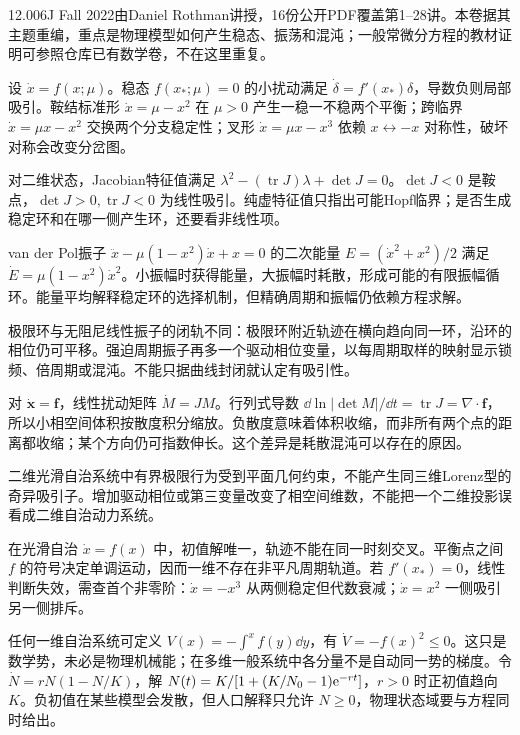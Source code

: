 12.006J Fall 2022由Daniel Rothman讲授，16份公开PDF覆盖第1--28讲。本卷据其主题重编，重点是物理模型如何产生稳态、振荡和混沌；一般常微分方程的教材证明可参照仓库已有数学卷，不在这里重复。

设 $\dot x=f(x;\mu)$。稳态 $f(x_*;\mu)=0$ 的小扰动满足 $\dot\delta=f'(x_*)\delta$，导数负则局部吸引。鞍结标准形 $\dot x=\mu-x^2$ 在 $\mu>0$ 产生一稳一不稳两个平衡；跨临界 $\dot x=\mu x-x^2$ 交换两个分支稳定性；叉形 $\dot x=\mu x-x^3$ 依赖 $x\leftrightarrow-x$ 对称性，破坏对称会改变分岔图。

对二维状态，Jacobian特征值满足 $\lambda^2-(\operatorname{tr}J)\lambda+\det J=0$。$\det J<0$ 是鞍点，$\det J>0,\operatorname{tr}J<0$ 为线性吸引。纯虚特征值只指出可能Hopf临界；是否生成稳定环和在哪一侧产生环，还要看非线性项。

van der Pol振子 $\ddot x-\mu(1-x^2)\dot x+x=0$ 的二次能量 $E=(\dot x^2+x^2)/2$ 满足 $\dot E=\mu(1-x^2)\dot x^2$。小振幅时获得能量，大振幅时耗散，形成可能的有限振幅循环。能量平均解释稳定环的选择机制，但精确周期和振幅仍依赖方程求解。

极限环与无阻尼线性振子的闭轨不同：极限环附近轨迹在横向趋向同一环，沿环的相位仍可平移。强迫周期振子再多一个驱动相位变量，以每周期取样的映射显示锁频、倍周期或混沌。不能只据曲线封闭就认定有吸引性。

对 $\dot{\mathbf x}=\mathbf f$，线性扰动矩阵 $\dot M=J M$。行列式导数 $\dd\ln|\det M|/\dd t=\operatorname{tr}J=\nabla\cdot\mathbf f$，所以小相空间体积按散度积分缩放。负散度意味着体积收缩，而非所有两个点的距离都收缩；某个方向仍可指数伸长。这个差异是耗散混沌可以存在的原因。

二维光滑自治系统中有界极限行为受到平面几何约束，不能产生同三维Lorenz型的奇异吸引子。增加驱动相位或第三变量改变了相空间维数，不能把一个二维投影误看成二维自治动力系统。

在光滑自治 $\dot x=f(x)$ 中，初值解唯一，轨迹不能在同一时刻交叉。平衡点之间 $f$ 的符号决定单调运动，因而一维不存在非平凡周期轨道。若 $f'(x_*)=0$，线性判断失效，需查首个非零阶：$\dot x=-x^3$ 从两侧稳定但代数衰减；$\dot x=x^2$ 一侧吸引另一侧排斥。

任何一维自治系统可定义 $V(x)=-\int^xf(y)\dd y$，有 $\dot V=-f(x)^2\le0$。这只是数学势，未必是物理机械能；在多维一般系统中各分量不是自动同一势的梯度。令 $\dot N=rN(1-N/K)$，解 $N(t)=K/[1+(K/N_0-1)\mathrm e^{-rt}]$，$r>0$ 时正初值趋向 $K$。负初值在某些模型会发散，但人口解释只允许 $N\ge0$，物理状态域要与方程同时给出。

